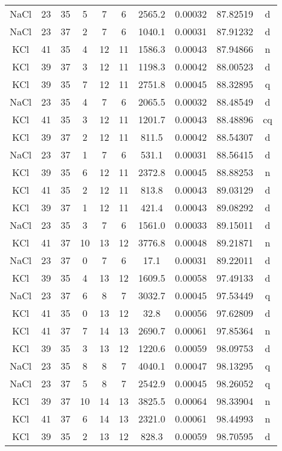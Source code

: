 \begin{table*}[htp]
\begin{tabular}{cccccccccc}
NaCl & 23 & 35 & 5 & 7 & 6 & 2565.2 & 0.00032 & 87.82519 & d \\
NaCl & 23 & 37 & 2 & 7 & 6 & 1040.1 & 0.00031 & 87.91232 & d \\
KCl & 41 & 35 & 4 & 12 & 11 & 1586.3 & 0.00043 & 87.94866 & n \\
KCl & 39 & 37 & 3 & 12 & 11 & 1198.3 & 0.00042 & 88.00523 & d \\
KCl & 39 & 35 & 7 & 12 & 11 & 2751.8 & 0.00045 & 88.32895 & q \\
NaCl & 23 & 35 & 4 & 7 & 6 & 2065.5 & 0.00032 & 88.48549 & d \\
KCl & 41 & 35 & 3 & 12 & 11 & 1201.7 & 0.00043 & 88.48896 & cq \\
KCl & 39 & 37 & 2 & 12 & 11 & 811.5 & 0.00042 & 88.54307 & d \\
NaCl & 23 & 37 & 1 & 7 & 6 & 531.1 & 0.00031 & 88.56415 & d \\
KCl & 39 & 35 & 6 & 12 & 11 & 2372.8 & 0.00045 & 88.88253 & n \\
KCl & 41 & 35 & 2 & 12 & 11 & 813.8 & 0.00043 & 89.03129 & d \\
KCl & 39 & 37 & 1 & 12 & 11 & 421.4 & 0.00043 & 89.08292 & d \\
NaCl & 23 & 35 & 3 & 7 & 6 & 1561.0 & 0.00033 & 89.15011 & d \\
KCl & 41 & 37 & 10 & 13 & 12 & 3776.8 & 0.00048 & 89.21871 & n \\
NaCl & 23 & 37 & 0 & 7 & 6 & 17.1 & 0.00031 & 89.22011 & d \\
KCl & 39 & 35 & 4 & 13 & 12 & 1609.5 & 0.00058 & 97.49133 & d \\
NaCl & 23 & 37 & 6 & 8 & 7 & 3032.7 & 0.00045 & 97.53449 & q \\
KCl & 41 & 35 & 0 & 13 & 12 & 32.8 & 0.00056 & 97.62809 & d \\
KCl & 41 & 37 & 7 & 14 & 13 & 2690.7 & 0.00061 & 97.85364 & n \\
KCl & 39 & 35 & 3 & 13 & 12 & 1220.6 & 0.00059 & 98.09753 & d \\
NaCl & 23 & 35 & 8 & 8 & 7 & 4040.1 & 0.00047 & 98.13295 & q \\
NaCl & 23 & 37 & 5 & 8 & 7 & 2542.9 & 0.00045 & 98.26052 & q \\
KCl & 39 & 37 & 10 & 14 & 13 & 3825.5 & 0.00064 & 98.33904 & n \\
KCl & 41 & 37 & 6 & 14 & 13 & 2321.0 & 0.00061 & 98.44993 & n \\
KCl & 39 & 35 & 2 & 13 & 12 & 828.3 & 0.00059 & 98.70595 & d \\

\end{tabular}
\end{table*}
